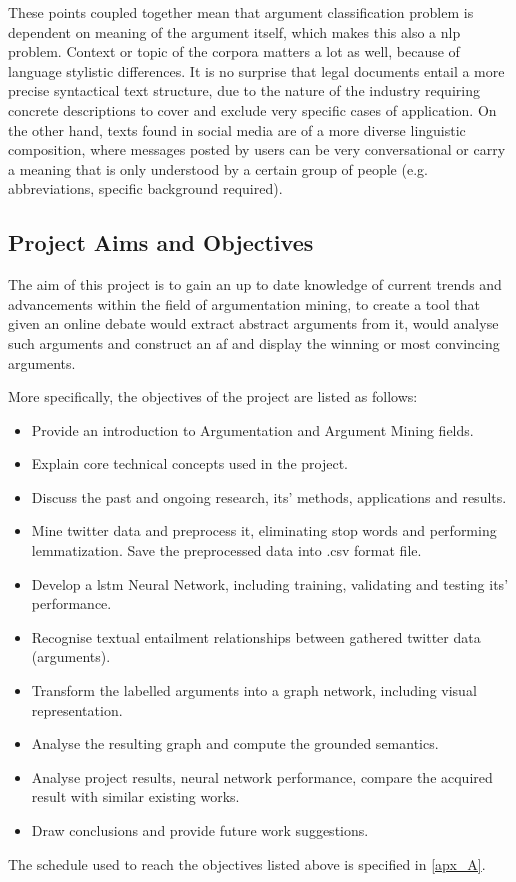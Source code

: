         These points coupled together mean that argument classification problem is dependent on meaning of the argument itself, which makes this also a \gls{nlp} problem. Context or topic of the corpora matters a lot as well, because of language stylistic differences. It is no surprise that legal documents entail a more precise syntactical text structure, due to the nature of the industry requiring concrete descriptions to cover and exclude very specific cases of application. On the other hand, texts found in social media are of a more diverse linguistic composition, where messages posted by users can be very conversational or carry a meaning that is only understood by a certain group of people (e.g. abbreviations, specific background required).
    
    \subsection{Project Aims and Objectives} \label{aims:objectives}
        The aim of this project is to gain an up to date knowledge of current trends and advancements within the field of argumentation mining, to create a tool that given an online debate would extract abstract arguments from it, would analyse such arguments and construct an \gls{af} and display the winning or most convincing arguments.
        
        More specifically, the objectives of the project are listed as follows:
        \begin{itemize} 
            \item Provide an introduction to Argumentation and Argument Mining fields.
            \item Explain core technical concepts used in the project.
            \item Discuss the past and ongoing research, its' methods, applications and results.
            \item Mine twitter data and preprocess it, eliminating stop words and performing lemmatization. Save the preprocessed data into .csv format file.
            \item Develop a \gls{lstm} Neural Network, including training, validating and testing its' performance.
            \item Recognise textual entailment relationships between gathered twitter data (arguments).
            \item Transform the labelled arguments into a graph network, including visual representation.
            \item Analyse the resulting graph and compute the grounded semantics.
            \item Analyse project results, neural network performance, compare the acquired result with similar existing works.
            \item Draw conclusions and provide future work suggestions.
        \end{itemize}
    
    The schedule used to reach the objectives listed above is specified in \cref{apx_A}.